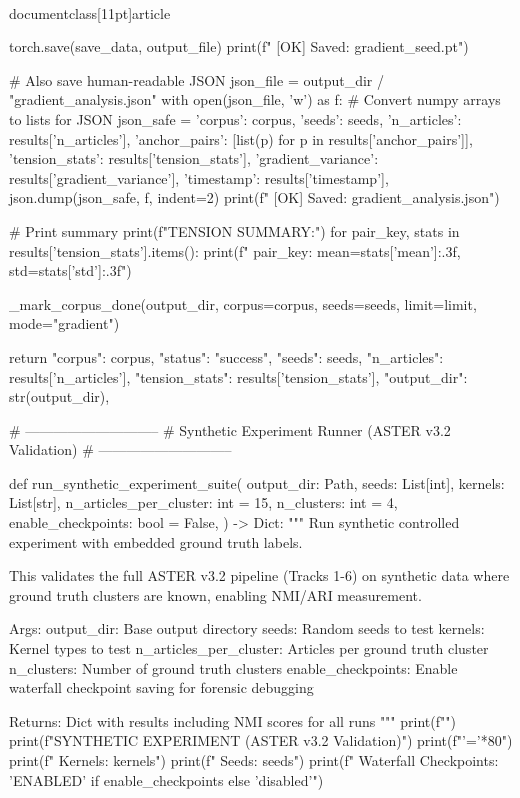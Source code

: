 \\documentclass[11pt]{article}
\begin{document}
\begin{CodeBlock}
        torch.save(save_data, output_file)
        print(f"  [OK] Saved: gradient_{seed}.pt")

    # Also save human-readable JSON
    json_file = output_dir / "gradient_analysis.json"
    with open(json_file, 'w') as f:
        # Convert numpy arrays to lists for JSON
        json_safe = {
            'corpus': corpus,
            'seeds': seeds,
            'n_articles': results['n_articles'],
            'anchor_pairs': [list(p) for p in results['anchor_pairs']],
            'tension_stats': results['tension_stats'],
            'gradient_variance': results['gradient_variance'],
            'timestamp': results['timestamp'],
        }
        json.dump(json_safe, f, indent=2)
    print(f"  [OK] Saved: gradient_analysis.json")

    # Print summary
    print(f"\n  TENSION SUMMARY:")
    for pair_key, stats in results['tension_stats'].items():
        print(f"    {pair_key}: mean={stats['mean']:.3f}, std={stats['std']:.3f}")

    _mark_corpus_done(output_dir, corpus=corpus, seeds=seeds, limit=limit, mode="gradient")

    return {
        "corpus": corpus,
        "status": "success",
        "seeds": seeds,
        "n_articles": results['n_articles'],
        "tension_stats": results['tension_stats'],
        "output_dir": str(output_dir),
    }


# -----------------------------
# Synthetic Experiment Runner (ASTER v3.2 Validation)
# -----------------------------

def run_synthetic_experiment_suite(
    output_dir: Path,
    seeds: List[int],
    kernels: List[str],
    n_articles_per_cluster: int = 15,
    n_clusters: int = 4,
    enable_checkpoints: bool = False,
) -> Dict:
    """
    Run synthetic controlled experiment with embedded ground truth labels.

    This validates the full ASTER v3.2 pipeline (Tracks 1-6) on synthetic
    data where ground truth clusters are known, enabling NMI/ARI measurement.

    Args:
        output_dir: Base output directory
        seeds: Random seeds to test
        kernels: Kernel types to test
        n_articles_per_cluster: Articles per ground truth cluster
        n_clusters: Number of ground truth clusters
        enable_checkpoints: Enable waterfall checkpoint saving for forensic debugging

    Returns:
        Dict with results including NMI scores for all runs
    """
    print(f"")
    print(f"SYNTHETIC EXPERIMENT (ASTER v3.2 Validation)")
    print(f"{'='*80}")
    print(f"  Kernels: {kernels}")
    print(f"  Seeds: {seeds}")
    print(f"  Waterfall Checkpoints: {'ENABLED' if enable_checkpoints else 'disabled'}")


\end{CodeBlock}
\end{document}
